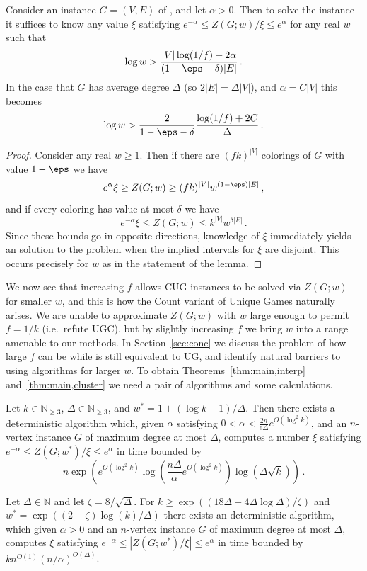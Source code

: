 %
\begin{lemma}\label{lem:solveCUG}
Consider an instance $G=(V,E)$ of , and let $\alpha>0$. 
Then to solve the instance it suffices to know any value $\xi$ satisfying $e^{-\alpha} \le Z(G;w)/\xi \le e^\alpha$ for any real $w$ such that
\[
\log w > \frac{|V|\log(1/f)+2\alpha}{(1-\eps-\delta)|E|}\,.
\]
In the case that $G$ has average degree $\Delta$ (so $2|E|=\Delta|V|$), and $\alpha=C|V|$ this becomes 
\[
\log w > \frac{2}{1-\eps-\delta}\frac{\log(1/f)+2C}{\Delta}\,.
\]
\end{lemma}
%
\begin{proof}
Consider any real $w\ge 1$.
Then if there are $(fk)^{|V|}$ colorings of $G$ with value $1-\eps$ we have 
\[
e^{\alpha}\xi \ge Z(G;w) \ge (fk)^{|V|}w^{(1-\eps)|E|}\,,
\]
and if every coloring has value at most $\delta$ we have 
\[
e^{-\alpha}\xi \le Z(G;w)\le k^{|V|}w^{\delta|E|}\,.
\] 
Since these bounds go in opposite directions, knowledge of $\xi$ immediately yields an solution to the problem when the implied intervals for $\xi$ are disjoint. 
This occurs precisely for $w$ as in the statement of the lemma. 
\end{proof}
%
We now see that increasing $f$ allows CUG instances to be solved via $Z(G;w)$ for smaller $w$, and this is how the Count variant of Unique Games naturally arises. 
We are unable to approximate $Z(G;w)$ with $w$ large enough to permit $f=1/k$ (i.e.\ refute UGC), but by slightly increasing $f$ we bring $w$ into a range amenable to our methods. 
In Section~\ref{sec:conc} we discuss the problem of how large $f$ can be while \CUG[f] is still equivalent to UG, and identify natural barriers to using algorithms for larger $w$.
To obtain Theorems~\ref{thm:main,interp} and~\ref{thm:main,cluster} we need a pair of algorithms and some calculations. 
%
\begin{theorem}\label{thm:alg,interp}
Let $k\in \mathbb{N}_{\geq 3}$, $\Delta\in \mathbb{N}_{\geq 3}$, and $w^*=1+(\log k -1)/\Delta$. 
Then there exists a deterministic algorithm which, given $\alpha$ satisfying $0<\alpha<\frac{2n}{e\Delta}e^{O(\log^2 k)}$,
and an $n$-vertex \UG[k] instance $G$ of maximum degree at most $\Delta$, computes a number $\xi$ satisfying $e^{-\alpha} \le Z(G;w^*)/\xi \le e^{\alpha}$ in time bounded by
\[
n\exp\left(e^{O(\log^2 k)} \log\left(\frac{n\Delta}{\alpha}e^{O(\log^2 k)}\right)\log(\Delta\sqrt k)\right)\,.
\]
\end{theorem}
%
\begin{theorem}\label{thm:alg,cluster}
Let $\Delta\in \mathbb{N}$ and let $\zeta=8/\sqrt{\Delta}$.
For $k\geq\exp{((18\Delta+4\Delta\log\Delta)/\zeta)}$ and $w^*=\exp((2-\zeta) \log(k)/\Delta)$ there exists an deterministic algorithm, which given $\alpha>0$ and an $n$-vertex \UG[k] instance $G$ of maximum degree at most $\Delta$, computes $\xi$ satisfying $e^{-\alpha}\le |Z(G;w^*)/\xi| \le e^\alpha$ in time bounded by $kn^{O(1)}(n/\alpha)^{O(\Delta)}$.
\end{theorem}
